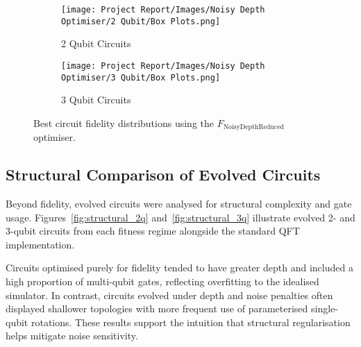 \documentclass[11pt,a4paper]{article}
\begin{document}
\begin{figure}[H]
\centering
\begin{subfigure}{.5\textwidth}
  \centering
  \texttt{[image: Project Report/Images/Noisy Depth Optimiser/2 Qubit/Box Plots.png]}
  \caption{2 Qubit Circuits}
  \label{fig:noisydepth_box_2q}
\end{subfigure}%
\begin{subfigure}{.5\textwidth}
  \centering
  \texttt{[image: Project Report/Images/Noisy Depth Optimiser/3 Qubit/Box Plots.png]}
  \caption{3 Qubit Circuits}
  \label{fig:noisydepth_box_3q}
\end{subfigure}
\caption{Best circuit fidelity distributions using the $F_{\mathrm{NoisyDepthReduced}}$ optimiser.}
\label{fig:noisydepth_box_plots}
\end{figure}


\subsection{Structural Comparison of Evolved Circuits}
Beyond fidelity, evolved circuits were analysed for structural complexity and gate usage. Figures~\ref{fig:structural_2q} and~\ref{fig:structural_3q} illustrate evolved 2- and 3-qubit circuits from each fitness regime alongside the standard QFT implementation.\newline

Circuits optimised purely for fidelity tended to have greater depth and included a high proportion of multi-qubit gates, reflecting overfitting to the idealised simulator. In contrast, circuits evolved under depth and noise penalties often displayed shallower topologies with more frequent use of parameterised single-qubit rotations. These results support the intuition that structural regularisation helps mitigate noise sensitivity.
\end{document}
